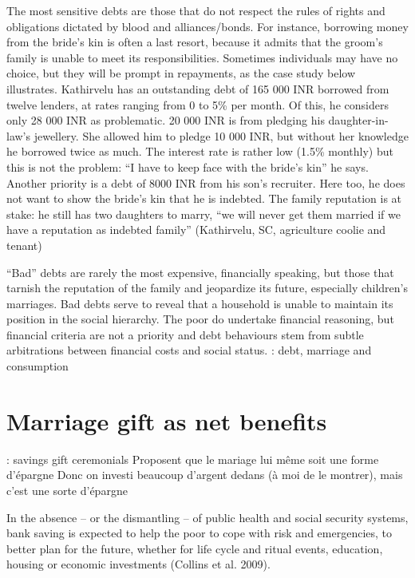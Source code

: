 \documentclass[a4paper, 11pt, onecolumn]{article}
\begin{document}
The most sensitive debts are those that do not respect the rules of rights and
obligations dictated by blood and alliances/bonds. For instance, borrowing money
from the bride’s kin is often a last resort, because it admits that the groom’s family is
unable to meet its responsibilities. Sometimes individuals may have no choice, but they
will be prompt in repayments, as the case study below illustrates.
Kathirvelu has an outstanding debt of 165 000 INR borrowed from twelve lenders, at rates ranging from 0 to
5\% per month. Of this, he considers only 28 000 INR as problematic. 20 000 INR is from pledging his
daughter-in-law’s jewellery. She allowed him to pledge 10 000 INR, but without her knowledge he
borrowed twice as much. The interest rate is rather low (1.5\% monthly) but this is not the problem: “I have
to keep face with the bride’s kin” he says. Another priority is a debt of 8000 INR from his son’s recruiter.
Here too, he does not want to show the bride’s kin that he is indebted. The family reputation is at stake: he
still has two daughters to marry, “we will never get them married if we have a reputation as indebted
family” (Kathirvelu, SC, agriculture coolie and tenant)

“Bad” debts are
rarely the most expensive, financially speaking, but those that tarnish the reputation of the
family and jeopardize its future, especially children’s marriages. Bad debts serve to reveal that a household is unable to maintain its position in the social hierarchy. The poor do
undertake financial reasoning, but financial criteria are not a priority and debt behaviours
stem from subtle arbitrations between financial costs and social status.
\cite{James2020} : debt, marriage and consumption










\section{Marriage gift as net benefits}
\cite{Guerin2020c} : savings gift ceremonials
Proposent que le mariage lui même soit une forme d'épargne
Donc on investi beaucoup d'argent dedans (à moi de le montrer), mais c'est une sorte d'épargne

In the absence – or the dismantling – of public health and social security systems, bank saving is
expected to help the poor to cope with risk and emergencies, to better plan for the future, whether for
life cycle and ritual events, education, housing or economic investments (Collins et al. 2009).
\end{document}
